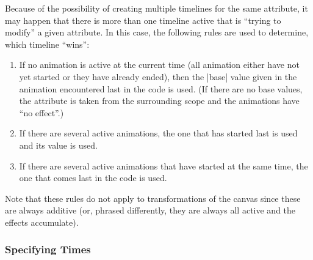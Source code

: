 Because of the possibility of creating multiple timelines for the same
attribute, it may happen that there is more than one timeline active that is
``trying to modify'' a given attribute. In this case, the following rules are
used to determine, which timeline ``wins'':
%
\begin{enumerate}
    \item If no animation is active at the current time (all animation either
        have not yet started or they have already ended), then the |base| value
        given in the animation encountered last in the code is used. (If there
        are no base values, the attribute is taken from the surrounding scope
        and the animations have ``no effect''.)
    \item If there are several active animations, the one that has started last
        is used and its value is used.
    \item If there are several active animations that have started at the same
        time, the one that comes last in the code is used.
\end{enumerate}

Note that these rules do not apply to transformations of the canvas since these
are always additive (or, phrased differently, they are always all active and
the effects accumulate).


\subsubsection{Specifying Times}
\label{section-anim-def-times}

